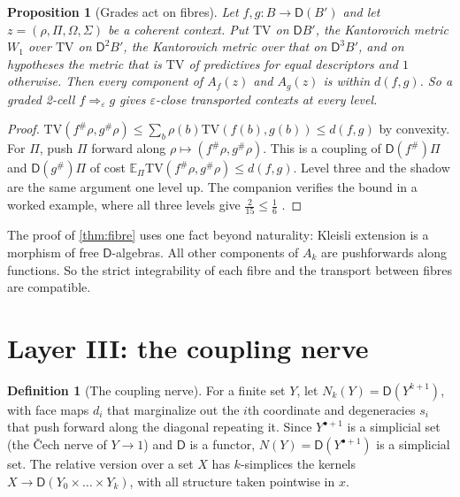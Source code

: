 \documentclass[11pt]{article}
\newtheorem{proposition}[theorem]{Proposition}
\theoremstyle{definition}
\newtheorem{definition}[theorem]{Definition}
\theoremstyle{remark}
\newcommand{\D}{\mathsf{D}}
\newcommand{\TV}{\mathrm{TV}}
\begin{document}
\begin{proposition}[Grades act on fibres]\label{prop:gradefibre}
Let $f,g\colon B\to\D(B')$ and let $z=(\rho,\Pi,\Omega,\Sigma)$ be a coherent context. Put $\mathrm{TV}$ on $\D B'$, the
Kantorovich metric $W_1$ over $\mathrm{TV}$ on $\D^2B'$, the Kantorovich metric over that on $\D^3B'$, and on hypotheses the
metric that is $\TV$ of predictives for equal descriptors and $1$ otherwise. Then every component of $A_f(z)$ and
$A_g(z)$ is within $d(f,g)$. So a graded 2-cell $f\Rightarrow_\varepsilon g$ gives $\varepsilon$-close transported contexts at
every level.
\end{proposition}
\begin{proof}
$\TV(f^\#\rho,g^\#\rho)\le\sum_b\rho(b)\TV(f(b),g(b))\le d(f,g)$ by convexity. For $\Pi$, push $\Pi$ forward along
$\rho\mapsto(f^\#\rho,g^\#\rho)$. This is a coupling of $\D(f^\#)\Pi$ and $\D(g^\#)\Pi$ of cost $\mathbb E_\Pi\TV(f^\#\rho,g^\#\rho)\le d(f,g)$.
Level three and the shadow are the same argument one level up. The companion verifies the bound in a worked
example, where all three levels give $\tfrac2{15}\le\tfrac16$ \cite[\S11]{Awasthi-Family}.
\end{proof}

The proof of \cref{thm:fibre} uses one fact beyond naturality: Kleisli extension is a morphism of free
$\D$-algebras. All other components of $A_k$ are pushforwards along functions. So the strict integrability of
each fibre and the transport between fibres are compatible.

\section{Layer III: the coupling nerve}\label{sec:nerve}

\begin{definition}[The coupling nerve]\label{def:nerve}
For a finite set $Y$, let $N_k(Y)=\D(Y^{k+1})$, with face maps $d_i$ that marginalize out the $i$th coordinate and
degeneracies $s_i$ that push forward along the diagonal repeating it. Since $Y^{\bullet+1}$ is a simplicial set (the
Čech nerve of $Y\to1$) and $\D$ is a functor, $N(Y)=\D(Y^{\bullet+1})$ is a simplicial set. The relative version over a
set $X$ has $k$-simplices the kernels $X\to\D(Y_0\times\dots\times Y_k)$, with all structure taken pointwise in $x$.
\end{definition}
\end{document}

